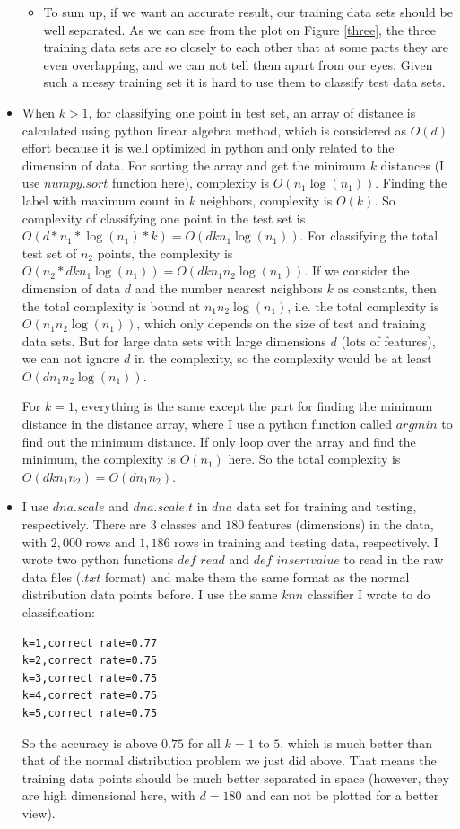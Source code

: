 \begin{itemize}
\begin{itemize}
\item To sum up, if we want an accurate result, our training data sets should be well separated. As we can see from the plot on Figure \ref{three}, the three training data sets are so closely to each other that at some parts they are even overlapping, and we can not tell them apart from our eyes. Given such a messy training set it is hard to use them to classify test data sets. 
\end{itemize}

\item When $k>1$, for classifying one point in test set, an array of distance is calculated using python linear algebra method, which is considered as $O(d)$ effort because it is well optimized in python and only related to the dimension of data. For sorting the array and get the minimum $k$ distances (I use $numpy.sort$ function here), complexity is $O(n_1\log(n_1))$. Finding the label with maximum count in $k$ neighbors, complexity is $O(k)$. So complexity of classifying one point in the test set is $O(d*n_1*\log(n_1)*k)=O(dkn_1\log(n_1))$. For classifying the total test set of $n_2$ points, the complexity is $O(n_2*dkn_1\log(n_1))=O(dkn_1n_2\log(n_1))$. If we consider the dimension of data $d$ and the number nearest neighbors $k$ as constants, then the total complexity is bound at $n_1n_2\log(n_1)$, i.e. the total complexity is $O(n_1n_2\log(n_1))$, which only depends on the size of test and training data sets. But for large data sets with large dimensions $d$ (lots of features), we can not ignore $d$ in the complexity, so the complexity would be at least $O(dn_1n_2\log(n_1))$. 

For $k=1$, everything is the same except the part for finding the minimum distance in the distance array, where I use a python function called $argmin$ to find out the minimum distance. If only loop over the array and find the minimum, the complexity is $O(n_1)$ here. So the total complexity is $O(dkn_1n_2)=O(dn_1n_2)$. 

\item I use $dna.scale$ and $dna.scale.t$ in $dna$ data set for training and testing, respectively. There are $3$ classes and $180$ features (dimensions) in the data, with $2,000$ rows and $1,186$ rows in training and testing data, respectively. I wrote two python functions $def$ $read$ and $def$ $insertvalue$ to read in the raw data files ($.txt$ format) and make them the same format as the normal distribution data points before. I use the same $knn$ classifier I wrote to do classification: 

\begin{verbatim}
k=1,correct rate=0.77
k=2,correct rate=0.75
k=3,correct rate=0.75
k=4,correct rate=0.75
k=5,correct rate=0.75
\end{verbatim}

So the accuracy is above $0.75$ for all $k=1$ to $5$, which is much better than that of the normal distribution problem we just did above. That means the training data points should be much better separated in space (however, they are high dimensional here, with $d=180$ and can not be plotted for a better view). 

\end{itemize}





